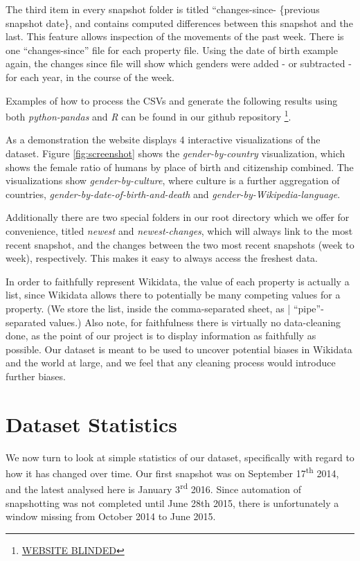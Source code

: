 \documentclass[letterpaper]{article}
\begin{document}
The third item in every snapshot folder is titled ``changes-since- \{previous snapshot date\}, and contains computed differences between this snapshot and the last. This feature allows inspection of the movements of the past week. There is one ``changes-since'' file for each property file. Using the date of birth example again, the changes since file will show which genders were added - or subtracted - for each year, in the course of the week.

Examples of how to process the CSVs and generate the following results using both \textit{python-pandas} and \textit{R} can be found in our github repository \footnote{\url{WEBSITE BLINDED}}.

As a demonstration the website displays 4 interactive visualizations of the dataset. Figure \ref{fig:screenshot} shows the \textit{gender-by-country} visualization, which shows the female ratio of humans by place of birth and citizenship combined. The visualizations show \textit{gender-by-culture}, where culture is a further aggregation of countries, \textit{gender-by-date-of-birth-and-death} and \textit{gender-by-Wikipedia-language}.

Additionally there are two special folders in our root directory which we offer for convenience,  titled \textit{newest} and \textit{newest-changes}, which will always link to the most recent snapshot, and the changes between the two most recent snapshots (week to week), respectively. This makes it easy to always access the freshest data.

In order to faithfully represent Wikidata, the value of each property is actually a list, since Wikidata allows there to potentially be many competing values for a property. (We store the list, inside the comma-separated sheet, as | ``pipe''-separated values.)  Also note, for faithfulness there is virtually no data-cleaning done, as the point of our project is to display information as faithfully as possible. Our dataset is meant to be used to uncover potential biases in Wikidata and the world at large, and we feel that any cleaning process would introduce further biases.

\section{Dataset Statistics}
We now turn to look at simple statistics of our dataset, specifically with regard to how it has changed over time. Our first snapshot was on September 17\textsuperscript{th} 2014, and the latest analysed here is January 3\textsuperscript{rd} 2016. Since automation of snapshotting was not completed until June 28th 2015, there is unfortunately a window missing from October 2014 to June 2015. 
\end{document}
